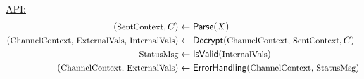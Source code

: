 \underline{ API:} 
\begin{align*}
(\textrm{\small SentContext},C) &\gets \textsf{Parse}(X) \\
(\textrm{\small ChannelContext, ExternalVals, InternalVals}) &\gets \textsf{Decrypt}(\textrm{\small ChannelContext, SentContext}, C)\\
\textrm{\small StatusMsg} &\gets \textsf{IsValid}(\textrm{\small InternalVals})\\
(\textrm{\small ChannelContext, ExternalVals}) &\gets \textsf{ErrorHandling}(\textrm{\small ChannelContext, StatusMsg})
\end{align*}
